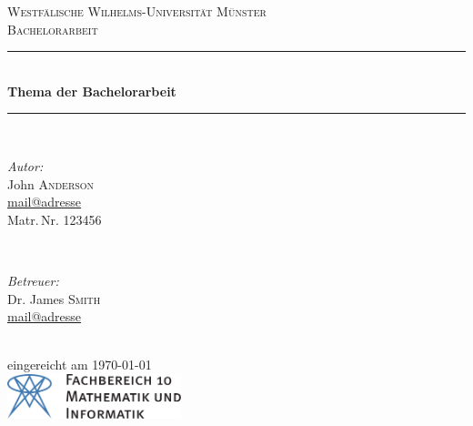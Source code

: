 


\begin{titlepage}
	\newcommand{\HRule}{\rule{\linewidth}{0.5mm}} %

	\center %
 

	\textsc{\LARGE Westfälische Wilhelms-Universität Münster}\\[1.5cm] %
	\textsc{\Large Bachelorarbeit}\\[0.5cm] %


	\HRule \\[0.4cm]
	
	{\onehalfspacing\huge\sffamily\bfseries Thema der Bachelorarbeit \singlespacing} %
	\vspace{-0.4cm}
	\HRule \\[1.5cm] 
	

	\begin{minipage}[t]{0.4\textwidth}
	\begin{flushleft} \large
	\emph{Autor:}\\
	John \textsc{Anderson}\\ %
	\normalsize \url{mail@adresse}\\
	Matr.\,Nr. 123456
	\end{flushleft}
	\end{minipage}
	~
	\begin{minipage}[t]{0.4\textwidth}
	\begin{flushright} \large
	\emph{Betreuer:} \\
	Dr. James \textsc{Smith}\\ %
	\normalsize \url{mail@adresse}
	\end{flushright}
	\end{minipage}\\[4cm]

	{\large eingereicht am \today}\\[3cm] %


	\includegraphics[height=1.3cm,keepaspectratio]{Bilder/fb10logo.pdf}\\[1cm] %
 

	\vfill %
	
\end{titlepage}
